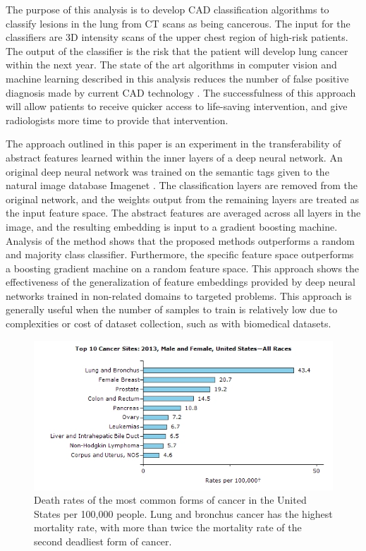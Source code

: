 \documentclass[conference,11pt]{IEEEtran}
\begin{document}
The purpose of this analysis is to develop CAD classification algorithms to classify lesions in the lung from CT scans as being cancerous. The input for the classifiers are 3D intensity scans of the upper chest region of high-risk patients. The output of the classifier is the risk that the patient will develop lung cancer within the next year. The state of the art algorithms in computer vision and machine learning described in this analysis reduces the number of false positive diagnosis made by current CAD technology \cite{sun_automatic_2017}. The successfulness of this approach will allow patients to receive quicker access to life-saving intervention, and give radiologists more time to provide that intervention.

The approach outlined in this paper is an experiment in the transferability of abstract features learned within the inner layers of a deep neural network. An original deep neural network was trained on the semantic tags given to the natural image database Imagenet \cite{russakovsky_imagenet_2015,yosinski_how_2014,he_deep_2015}. The classification layers are removed from the original network, and the weights output from the remaining layers are treated as the input feature space. The abstract features are averaged across all layers in the image, and the resulting embedding is input to a gradient boosting machine. Analysis of the method shows that the proposed methods outperforms a random and majority class classifier. Furthermore, the specific feature space outperforms a boosting gradient machine on a random feature space. This approach shows the effectiveness of the generalization of feature embeddings provided by deep neural networks trained in non-related domains to targeted problems. This approach is generally useful when the number of samples to train is relatively low due to complexities or cost of dataset collection, such as with biomedical datasets.

\begin{figure}
    \centering
    \includegraphics[width=0.8\linewidth]{figures/plot_top_ten_cancers.jpg}
    \caption{Death rates of the most common forms of cancer in the United States per 100,000 people. Lung and bronchus cancer has the highest mortality rate, with more than twice the mortality rate of the second deadliest form of cancer.}
      \label{fig:cancer}
\end{figure}
\end{document}
